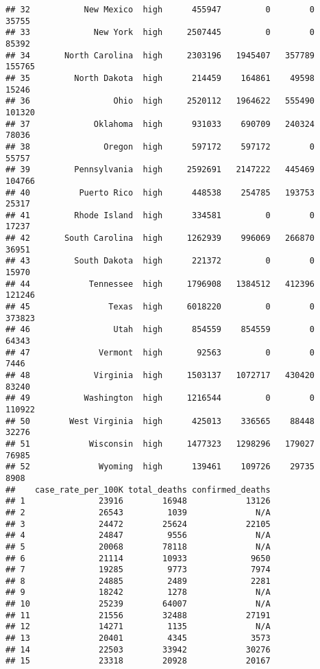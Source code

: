 \documentclass[
]{article}
\begin{document}
\begin{verbatim}
## 32           New Mexico  high      455947         0        0             35755
## 33             New York  high     2507445         0        0             85392
## 34       North Carolina  high     2303196   1945407   357789            155765
## 35         North Dakota  high      214459    164861    49598             15246
## 36                 Ohio  high     2520112   1964622   555490            101320
## 37             Oklahoma  high      931033    690709   240324             78036
## 38               Oregon  high      597172    597172        0             55757
## 39         Pennsylvania  high     2592691   2147222   445469            104766
## 40          Puerto Rico  high      448538    254785   193753             25317
## 41         Rhode Island  high      334581         0        0             17237
## 42       South Carolina  high     1262939    996069   266870             36951
## 43         South Dakota  high      221372         0        0             15970
## 44            Tennessee  high     1796908   1384512   412396            121246
## 45                Texas  high     6018220         0        0            373823
## 46                 Utah  high      854559    854559        0             64343
## 47              Vermont  high       92563         0        0              7446
## 48             Virginia  high     1503137   1072717   430420             83240
## 49           Washington  high     1216544         0        0            110922
## 50        West Virginia  high      425013    336565    88448             32276
## 51            Wisconsin  high     1477323   1298296   179027             76985
## 52              Wyoming  high      139461    109726    29735              8908
##    case_rate_per_100K total_deaths confirmed_deaths
## 1               23916        16948            13126
## 2               26543         1039              N/A
## 3               24472        25624            22105
## 4               24847         9556              N/A
## 5               20068        78118              N/A
## 6               21114        10933             9650
## 7               19285         9773             7974
## 8               24885         2489             2281
## 9               18242         1278              N/A
## 10              25239        64007              N/A
## 11              21556        32488            27191
## 12              14271         1135              N/A
## 13              20401         4345             3573
## 14              22503        33942            30276
## 15              23318        20928            20167

\end{verbatim}
\end{document}
